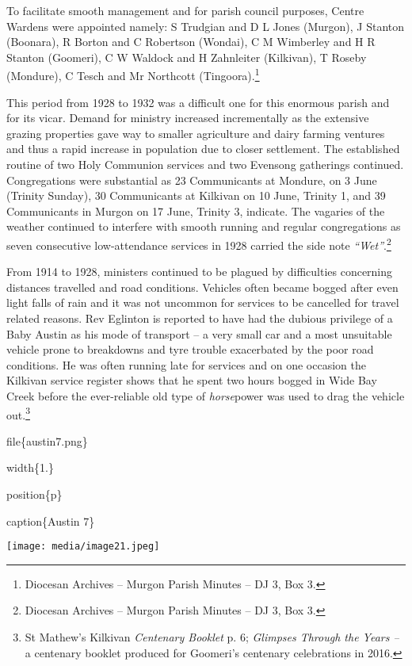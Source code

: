 To facilitate smooth management and for parish council purposes, Centre Wardens were appointed namely: S Trudgian and D L Jones (Murgon), J Stanton (Boonara), R Borton and C Robertson (Wondai), C M Wimberley and H R Stanton (Goomeri), C W Waldock and H Zahnleiter (Kilkivan), T Roseby (Mondure), C Tesch and Mr Northcott (Tingoora).\footnote{Diocesan Archives -- Murgon Parish Minutes -- DJ 3, Box 3.}

This period from 1928 to 1932 was a difficult one for this enormous parish and for its vicar. Demand for ministry increased incrementally as the extensive grazing properties gave way to smaller agriculture and dairy farming ventures and thus a rapid increase in population due to closer settlement. The established routine of two Holy Communion services and two Evensong gatherings continued. Congregations were substantial as 23 Communicants at Mondure, on 3 June (Trinity Sunday), 30 Communicants at Kilkivan on 10 June, Trinity 1, and 39 Communicants in Murgon on 17 June, Trinity 3, indicate. The vagaries of the weather continued to interfere with smooth running and regular congregations as seven consecutive low-attendance services in 1928 carried the side note \emph{``Wet''}.\footnote{Diocesan Archives -- Murgon Parish Minutes -- DJ 3, Box 3.}

From 1914 to 1928, ministers continued to be plagued by difficulties concerning distances travelled and road conditions. Vehicles often became bogged after even light falls of rain and it was not uncommon for services to be cancelled for travel related reasons. Rev Eglinton is reported to have had the dubious privilege of a Baby Austin as his mode of transport -- a very small car and a most unsuitable vehicle prone to breakdowns and tyre trouble exacerbated by the poor road conditions. He was often running late for services and on one occasion the Kilkivan service register shows that he spent two hours bogged in Wide Bay Creek before the ever-reliable old type of \emph{horse}power was used to drag the vehicle out.\footnote{St Mathew's Kilkivan \emph{Centenary Booklet} p. 6; \emph{Glimpses Through the Years --} a centenary booklet produced for Goomeri's centenary celebrations in 2016.}

file\{austin7.png\}

width\{1.\}

position\{p\}

caption\{Austin 7\}

\texttt{[image: media/image21.jpeg]}


